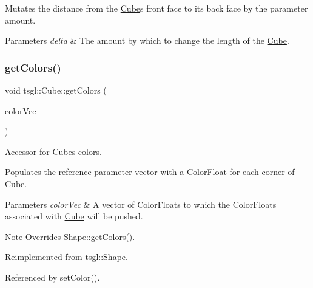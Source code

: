 Mutates the distance from the \hyperlink{classtsgl_1_1_cube}{Cube}\textquotesingle{}s front face to its back face by the parameter amount. 


\begin{DoxyParams}{Parameters}
{\em delta} & The amount by which to change the length of the \hyperlink{classtsgl_1_1_cube}{Cube}. \\
\hline
\end{DoxyParams}
\mbox{\label{classtsgl_1_1_cube_ac1d31d18439024e4160db369df463a7d}} 
\subsubsection{\texorpdfstring{get\+Colors()}{getColors()}}
{\footnotesize\ttfamily void tsgl\+::\+Cube\+::get\+Colors (\begin{DoxyParamCaption}\item[{std\+::vector$<$ \hyperlink{structtsgl_1_1_color_float}{Color\+Float} $>$ \&}]{color\+Vec }\end{DoxyParamCaption})\hspace{0.3cm}{\ttfamily [virtual]}}



Accessor for \hyperlink{classtsgl_1_1_cube}{Cube}\textquotesingle{}s colors. 

Populates the reference parameter vector with a \hyperlink{structtsgl_1_1_color_float}{Color\+Float} for each corner of \hyperlink{classtsgl_1_1_cube}{Cube}. 
\begin{DoxyParams}{Parameters}
{\em color\+Vec} & A vector of Color\+Floats to which the Color\+Floats associated with \hyperlink{classtsgl_1_1_cube}{Cube} will be pushed. \\
\hline
\end{DoxyParams}
\begin{DoxyNote}{Note}
Overrides \hyperlink{classtsgl_1_1_shape_a6f54fe4d049f69a287edf8335a9509f8}{Shape\+::get\+Colors()}. 
\end{DoxyNote}


Reimplemented from \hyperlink{classtsgl_1_1_shape_a6f54fe4d049f69a287edf8335a9509f8}{tsgl\+::\+Shape}.



Referenced by set\+Color().

\mbox{\label{classtsgl_1_1_cube_a4dd172e48230f83a70a09e3f3740265d}} 
